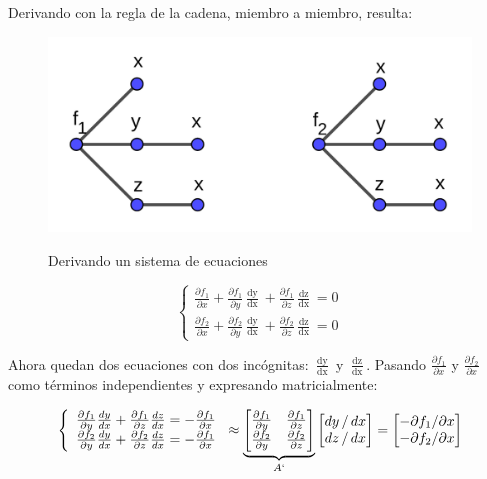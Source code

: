 \documentclass{article}
\begin{document}
Derivando con la regla de la cadena, miembro a miembro, resulta:

\begin{figure}[ht]
\caption{Derivando un sistema de ecuaciones}
\includegraphics[scale=1]{img/teo_fig009_tcd.png} 
\centering
\label{fig:tcd}
\end{figure}

\begin{equation}
\left\{
\begin{array}{ll}
\frac{\partial f_1}{\partial x} + \frac{\partial f_1}{\partial y} \frac{\mathop{dy}}{\mathop{dx}} + \frac{\partial f_1}{\partial z} \frac{\mathop{dz}}{\mathop{dx}} = 0 \\
\frac{\partial f_2}{\partial x} + \frac{\partial f_2}{\partial y} \frac{\mathop{dy}}{\mathop{dx}} + \frac{\partial f_2}{\partial z} \frac{\mathop{dz}}{\mathop{dx}} = 0
\end{array}
\right.
\end{equation}

Ahora quedan dos ecuaciones con dos incógnitas: $\frac{\mathop{dy}}{\mathop{dx}}$ y $\frac{\mathop{dz}}{\mathop{dx}}$. Pasando $\frac{\partial f_1}{\partial x}$ y $\frac{\partial f_2}{\partial x}$ como términos independientes y expresando matricialmente:

\begin{equation}
\left\{
\begin{array}{ll}
\frac{\partial f_1}{\partial y} \frac{\mathop{dy}}{\mathop{dx}} + \frac{\partial f_1}{\partial z} \frac{\mathop{dz}}{\mathop{dx}} = -\frac{\partial f_1}{\partial x} \\
\frac{\partial f_2}{\partial y} \frac{\mathop{dy}}{\mathop{dx}} + \frac{\partial f_2}{\partial z} \frac{\mathop{dz}}{\mathop{dx}} = -\frac{\partial f_1}{\partial x}
\end{array}
\right. \approx 
\underbrace{
\begin{bmatrix}
\frac{\partial f_1}{\partial y} & \frac{\partial f_1}{\partial z} \\
\frac{\partial f_2}{\partial y} & \frac{\partial f_2}{\partial z}
\end{bmatrix}
}_{A`}
\begin{bmatrix}
\mathop{dy}/\mathop{dx} \\
\mathop{dz}/\mathop{dx}
\end{bmatrix} = 
\begin{bmatrix}
-\partial f_1/ \partial x \\
-\partial f_2/ \partial x
\end{bmatrix}
\end{equation}
\end{document}

